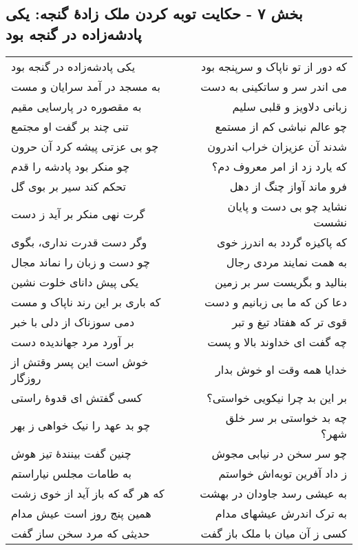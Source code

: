 \begin{center}
\section*{بخش ۷ - حکایت توبه کردن ملک زادهٔ گنجه: یکی پادشه‌زاده در گنجه بود}
\label{sec:007}
\begin{longtable}{l p{0.5cm} r}
یکی پادشه‌زاده در گنجه بود
&&
که دور از تو ناپاک و سرپنجه بود
\\
به مسجد در آمد سرایان و مست
&&
می اندر سر و ساتکینی به دست
\\
به مقصوره در پارسایی مقیم
&&
زبانی دلاویز و قلبی سلیم
\\
تنی چند بر گفت او مجتمع
&&
چو عالم نباشی کم از مستمع
\\
چو بی عزتی پیشه کرد آن حرون
&&
شدند آن عزیزان خراب اندرون
\\
چو منکر بود پادشه را قدم
&&
که یارد زد از امر معروف دم؟
\\
تحکم کند سیر بر بوی گل
&&
فرو ماند آواز چنگ از دهل
\\
گرت نهی منکر بر آید ز دست
&&
نشاید چو بی دست و پایان نشست
\\
وگر دست قدرت نداری، بگوی
&&
که پاکیزه گردد به اندرز خوی
\\
چو دست و زبان را نماند مجال
&&
به همت نمایند مردی رجال
\\
یکی پیش دانای خلوت نشین
&&
بنالید و بگریست سر بر زمین
\\
که باری بر این رند ناپاک و مست
&&
دعا کن که ما بی زبانیم و دست
\\
دمی سوزناک از دلی با خبر
&&
قوی تر که هفتاد تیغ و تبر
\\
بر آورد مرد جهاندیده دست
&&
چه گفت ای خداوند بالا و پست
\\
خوش است این پسر وقتش از روزگار
&&
خدایا همه وقت او خوش بدار
\\
کسی گفتش ای قدوهٔ راستی
&&
بر این بد چرا نیکویی خواستی؟
\\
چو بد عهد را نیک خواهی ز بهر
&&
چه بد خواستی بر سر خلق شهر؟
\\
چنین گفت بینندهٔ تیز هوش
&&
چو سر سخن در نیابی مجوش
\\
به طامات مجلس نیاراستم
&&
ز داد آفرین توبه‌اش خواستم
\\
که هر گه که باز آید از خوی زشت
&&
به عیشی رسد جاودان در بهشت
\\
همین پنج روز است عیش مدام
&&
به ترک اندرش عیشهای مدام
\\
حدیثی که مرد سخن ساز گفت
&&
کسی ز آن میان با ملک باز گفت
\\

\end{longtable}
\end{center}
